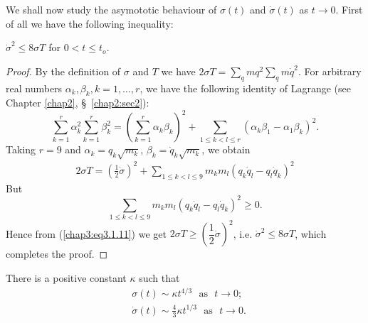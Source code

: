 We shall now study the asymototic behaviour of $\sigma(t)$ and
$\dot{\sigma}(t)$ as $t \to 0$. First of all we have the following
inequality: 

\setcounter{subtheorem}{0}
\begin{subtheorem}\label{chap3:thm3.1.1}
$\dot{\sigma}^2 \leq 8 \sigma T$ for $0 < t\leq t_o$. 
\end{subtheorem}

\begin{proof}
By the definition of $\sigma$ and $T$ we have $2\sigma T =
\sum\limits_q mq^2 \sum_q m\dot{q}^2$. For arbitrary real numbers
$\alpha_k, \beta_k, k = 1, \ldots, r$, we have the following identity
of Lagrange (see Chapter \ref{chap2}, \S\ \ref{chap2:sec2}): 
$$
\sum\limits^r_{k=1} \alpha^2_k \sum\limits^r_{k=1} \beta^2_k =
\left(\sum\limits^r_{k=1} \alpha_k \beta_k \right)^2 + \sum\limits_{1
  \leq k < l \leq r} \left(\alpha_k \beta_1 - \alpha_1 \beta_k
\right)^2. 
$$
Taking $r = 9$ and $\alpha_k = q_k \sqrt{m_k}$, $\beta_k =
\dot{q}_k\sqrt{m_k}$, we obtain 
\begin{align*}
2 \sigma T = \left(\frac{1}{2} \dot{\sigma} \right)^2 + \sum\limits_{1
  \leq k < l  \leq 9} m_k m_l (q_k \dot{q}_l -q_l \dot{q}_k)^2
\tag{3.1.11}\label{chap3:eq3.1.11} 
\end{align*}\pageoriginale 
But 
$$
\sum\limits_{1 \leq k < l \leq 9} m_k m_l (q_k \dot{q}_l - q_l
\dot{q}_k)^2 \geq 0.  
$$
Hence from (\ref{chap3:eq3.1.11}) we get $2 \sigma T \geq
(\dfrac{1}{2} \dot{\sigma})^2$, i.e. $\dot{\sigma}^2 \leq 8 \sigma T$,
which completes the proof. 
\end{proof}

\begin{subtheorem}\label{chap3:thm3.1.2}
There is a positive constant $\kappa$ such that
\begin{align*}
& \sigma (t) \sim \kappa t^{4/3} \text{~ as ~} t \to 0;
  \tag{3.1.12}\label{chap3:eq3.1.12}\\ 
& \dot{\sigma} (t) \sim \frac{4}{3} \kappa t^{1/3} \text{~ as ~} t \to
  0. \tag{3.1.13}\label{chap3:eq3.1.13} 
\end{align*}
\end{subtheorem}

